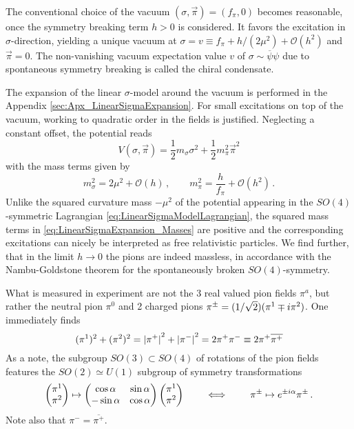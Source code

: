 The conventional choice of the vacuum ${(\sigma,\vec{\pi})=(f_\pi,0)}$ becomes reasonable, once the symmetry breaking term $h>0$ is considered. It favors the excitation in $\sigma$-direction, yielding a unique vacuum at ${\sigma=v\equiv f_\pi+h/(2\mu^2)+\mathcal{O}(h^2)}$ and $\vec{\pi}=0$. The non-vanishing vacuum expectation value $v$ of ${\sigma\sim\overline{\psi}\psi}$ due to spontaneous symmetry breaking is called the chiral condensate.

The expansion of the linear $\sigma$-model around the vacuum is performed in the Appendix \ref{sec:Apx_LinearSigmaExpansion}. For small excitations on top of the vacuum, working to quadratic order in the fields is justified. Neglecting a constant offset, the potential reads
\begin{equation}
    V(\sigma,\vec{\pi})=\frac{1}{2}m_\sigma\sigma^2+\frac{1}{2}m_\pi^2\vec{\pi}^2
\end{equation}
with the mass terms given by
\begin{equation}
    m_\sigma^2=2\mu^2+\mathcal{O}(h)\,,\qquad m_\pi^2=\frac{h}{f_\pi}+\mathcal{O}(h^2)\,.
    \label{eq:LinearSigmaExpansion_Masses}
\end{equation}
Unlike the squared curvature mass ${-\mu^2}$ of the potential appearing in the $SO(4)$-symmetric Lagrangian \ref{eq:LinearSigmaModelLagrangian}, the squared mass terms in \eqref{eq:LinearSigmaExpansion_Masses} are positive and the corresponding excitations can nicely be interpreted as free relativistic particles. We find further, that in the limit $h\to 0$ the pions are indeed massless, in accordance with the Nambu-Goldstone theorem for the spontaneously broken $SO(4)$-symmetry. 

What is measured in experiment are not the 3 real valued pion fields $\pi^a$, but rather the neutral pion $\pi^0$ and 2 charged pions $\pi^\pm=(1/\sqrt{2})(\pi^1\mp{i}\pi^2)$. One immediately finds 
\begin{equation}
    (\pi^1)^2+(\pi^2)^2={\vert\pi^+\vert}^2+{\vert\pi^-\vert}^2=2\pi^+\pi^-\equiv 2\pi^+\overline{\pi^+}
\end{equation}
As a note, the subgroup ${SO(3)\subset SO(4)}$ of rotations of the pion fields features the ${SO(2)\simeq U(1)}$ subgroup of symmetry transformations
\begin{equation}
    \begin{pmatrix}
        \pi^1\\\pi^2
    \end{pmatrix}
        \mapsto
        \begin{pmatrix}
            \cos\alpha&\sin\alpha\\-\sin\alpha&\cos\alpha
        \end{pmatrix}
        \begin{pmatrix}
            \pi^1\\\pi^2
        \end{pmatrix}
        \qquad\iff\qquad\pi^\pm\mapsto e^{\pm{i}\alpha}\pi^\pm\,.
\end{equation}
Note also that $\pi^-=\overline{\pi^+}$.

